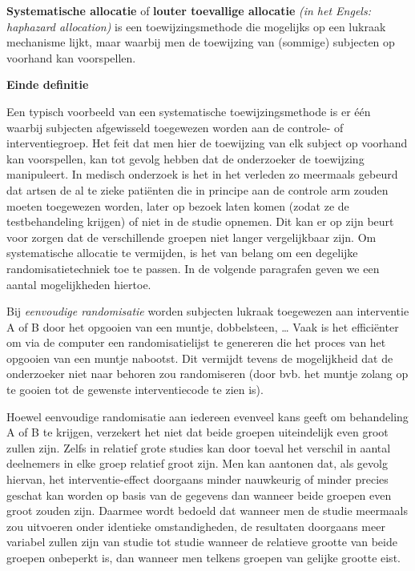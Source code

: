 \documentclass[
  12pt,dutch,coursenotes]{book}
\theoremstyle{definition}
\theoremstyle{definition}
\theoremstyle{definition}
\theoremstyle{remark}
\begin{document}
\textbf{Systematische allocatie} of \textbf{louter toevallige allocatie}
\emph{(in het Engels: haphazard allocation)} is een toewijzingsmethode die
mogelijks op een lukraak mechanisme lijkt, maar waarbij men de toewijzing
van (sommige) subjecten op voorhand kan voorspellen.

\textbf{Einde definitie}

Een typisch voorbeeld van een systematische toewijzingsmethode is er één
waarbij subjecten afgewisseld toegewezen worden aan de controle- of
interventiegroep. Het feit dat men hier de toewijzing van elk subject op voorhand kan
voorspellen, kan tot gevolg hebben dat de onderzoeker de toewijzing
manipuleert. In medisch onderzoek is het in het verleden zo meermaals gebeurd dat artsen de al te zieke patiënten die in principe aan de
controle arm zouden moeten toegewezen worden, later op bezoek laten komen
(zodat ze de testbehandeling krijgen) of niet in de studie opnemen. Dit
kan er op zijn beurt voor zorgen dat de verschillende groepen niet langer
vergelijkbaar zijn. Om systematische allocatie te vermijden, is het van
belang om een degelijke randomisatietechniek toe te passen. In de volgende
paragrafen geven we een aantal mogelijkheden hiertoe.

Bij \emph{eenvoudige randomisatie} worden subjecten lukraak toegewezen
aan interventie A of B door het opgooien van een muntje, dobbelsteen, \ldots{}
Vaak is het efficiënter om via de computer een randomisatielijst te
genereren die het proces van het opgooien van een muntje nabootst. Dit
vermijdt tevens de mogelijkheid dat de onderzoeker niet naar behoren zou
randomiseren (door bvb. het muntje zolang op te gooien tot de gewenste
interventiecode te zien is).

Hoewel eenvoudige randomisatie aan iedereen evenveel kans geeft om
behandeling A of B te krijgen, verzekert het niet dat beide groepen
uiteindelijk even groot zullen zijn. Zelfs in relatief grote studies kan
door toeval het verschil in aantal deelnemers in elke groep relatief groot
zijn. Men kan aantonen dat, als gevolg hiervan, het interventie-effect
doorgaans minder nauwkeurig of minder precies geschat kan worden op basis
van de gegevens dan wanneer beide groepen even groot zouden zijn. Daarmee
wordt bedoeld dat wanneer men de studie meermaals zou uitvoeren onder
identieke omstandigheden, de resultaten doorgaans meer variabel zullen zijn
van studie tot studie wanneer de relatieve grootte van beide groepen onbeperkt
is, dan wanneer men telkens groepen van gelijke grootte eist.
\end{document}
